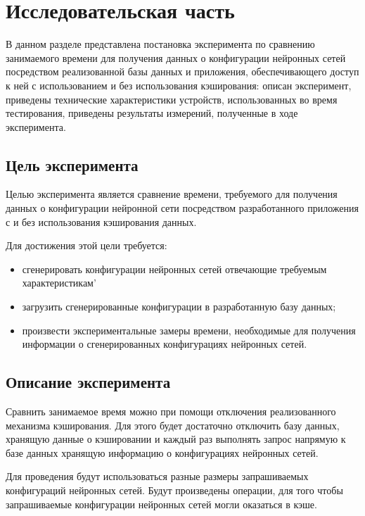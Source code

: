 \chapter{Исследовательская часть}

В данном разделе представлена постановка эксперимента по сравнению занимаемого времени для получения данных о конфигурации нейронных сетей посредством реализованной базы данных и приложения, обеспечивающего доступ к ней с использованием и без использования кэширования:  описан эксперимент, приведены технические характеристики устройств, использованных во время тестирования, приведены результаты измерений, полученные в ходе эксперимента.

\section{Цель эксперимента}

Целью эксперимента является сравнение времени, требуемого для получения данных о конфигурации нейронной сети посредством разработанного приложения с и без использования кэширования данных.

Для достижения этой цели требуется:
\begin{itemize}
    \item сгенерировать конфигурации нейронных сетей отвечающие требуемым характеристикам'
    \item загрузить сгенерированные конфигурации в разработанную базу данных;
    \item произвести экспериментальные замеры времени, необходимые для получения информации о сгенерированных конфигурациях нейронных сетей.
\end{itemize}

\section{Описание эксперимента}

Сравнить занимаемое время можно при помощи отключения реализованного механизма кэширования. Для этого будет достаточно отключить базу данных, хранящую данные о кэшировании и каждый раз выполнять запрос напрямую к базе данных хранящую информацию о конфигурациях нейронных сетей.

Для проведения будут использоваться разные размеры запрашиваемых конфигураций нейронных сетей. Будут произведены операции, для того чтобы запрашиваемые конфигурации нейронных сетей могли оказаться в кэше.

